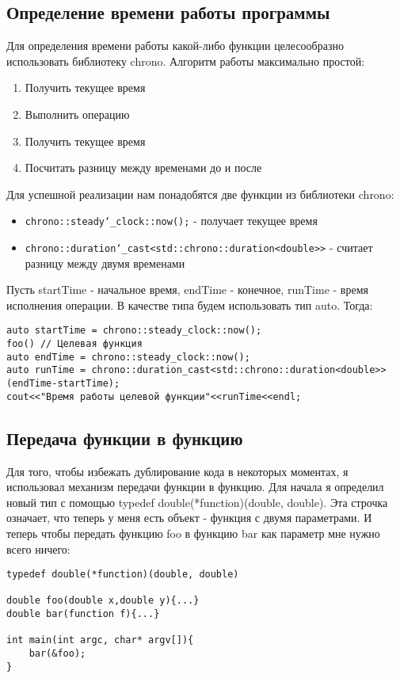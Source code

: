 \documentclass{article}
\begin{document}
\subsection{Определение времени работы программы}
Для определения времени работы какой-либо функции целесообразно использовать
библиотеку chrono. Алгоритм работы максимально простой:
\begin{enumerate}
    \item Получить текущее время
    \item Выполнить операцию
    \item Получить текущее время
    \item Посчитать разницу между временами до и после
\end{enumerate}
Для успешной реализации нам понадобятся две функции из библиотеки chrono:
\begin{itemize}
    \item \texttt{chrono::steady\char`_clock::now();} - получает текущее время
    \item \texttt{chrono::duration\char`_cast<std::chrono::duration<double>>} - считает разницу между двумя временами
\end{itemize}
Пусть startTime - начальное время, endTime - конечное, runTime - время исполнения операции. В качестве типа будем использовать тип auto. Тогда:
\begin{lstlisting}
auto startTime = chrono::steady_clock::now();
foo() // Целевая функция
auto endTime = chrono::steady_clock::now();
auto runTime = chrono::duration_cast<std::chrono::duration<double>>(endTime-startTime);
cout<<"Время работы целевой функции"<<runTime<<endl;
\end{lstlisting}
\subsection{Передача функции в функцию}
Для того, чтобы избежать дублирование кода в некоторых моментах, я использовал
механизм передачи функции в функцию. Для начала я определил новый тип с 
помощью typedef double(*function)(double, double). Эта строчка означает, что 
теперь у меня есть объект - функция с двумя параметрами. И теперь чтобы передать функцию foo в функцию bar как параметр мне нужно всего ничего:
\begin{lstlisting}
typedef double(*function)(double, double)

double foo(double x,double y){...}
double bar(function f){...}

int main(int argc, char* argv[]){
    bar(&foo);
}
\end{lstlisting}
\end{document}
